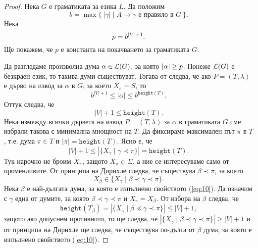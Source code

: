 \begin{proof}
  Нека $G$ е граматиката за езика $L$. Да положим
  \[b = \max\{\ |\gamma| \mid A \to \gamma \text{ е правило в }G\ \}.\]
  Нека
  \[p = b^{\vert{V}\vert + 1}.\]
  Ще покажем, че $p$ е константа на покачването за граматиката $G$.
  
  Да разгледаме произволна дума $\alpha \in \mathcal{L}(G)$, за която $\vert{\alpha}\vert \geq p$.
  Понеже $\mathcal{L}(G)$ е безкраен език, то такива думи съществуват.
  Тогава от  следва, че ако $P = (T,\lambda)$ е дърво на извод за $\alpha$ в $G$, за което $X_\varepsilon = S$, то
  \[b^{|V| + 1}\leq |\alpha| \leq b^{\texttt{height}(T)}.\]
  Оттук следва, че
  \[|V| + 1 \leq \texttt{height}(T).\]
  Нека измежду всички дървета на извод $P = (T,\lambda)$ за $\alpha$ в граматиката $G$ сме избрали такова с минимална мнощност на $T$.
  Да фиксираме максимален път $\pi$ в $T$, т.е. дума $\pi \in T$ и $|\pi| = \texttt{height}(T)$.
  Ясно е, че
  \[|V| + 1 \leq |\{ X_\gamma \mid \gamma \prec \pi\}| = \texttt{height}(T).\]
  Тук нарочно не броим $X_\pi$, защото $X_\pi \in \Sigma$, а ние се интересуваме само от променливите.
  От принципа на Дирихле следва, че съществува $\beta \prec \pi$, за което
  \begin{equation}
    \label{eq:10}
    X_\beta \in \{X_\gamma \mid \beta \prec \gamma \prec \pi\}.
  \end{equation}
  Нека $\beta$ е най-дългата дума, за която е изпълнено свойството (\ref{eq:10}).
  Да означим с $\gamma$ една от думите, за която $\beta \prec \gamma \prec \pi$ и $X_\gamma = X_\beta$.
  От избора на $\beta$ следва, че
  \begin{equation}
    \label{eq:11}
    \texttt{height}(T_\beta) = |\{ X_\gamma \mid \beta \preceq \gamma \prec \pi\}| \leq |V| + 1,
  \end{equation}
  защото ако допуснем противното, то ще следва, че $|\{ X_\gamma \mid \beta \prec \gamma \prec \pi\}| \geq |V| + 1$ и от принципа на Дирихле ще следва, че
  съществува по-дълга от $\beta$ дума, за която е изпълнено свойството (\ref{eq:10}).
  

\end{proof}
